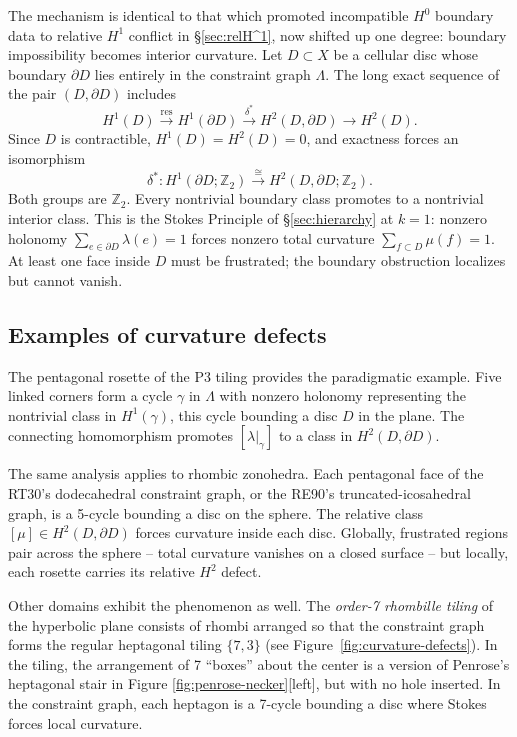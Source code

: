 \documentclass[11pt]{amsart}  %
\theoremstyle{plain}
\theoremstyle{definition}
\theoremstyle{remark}
\newcommand{\style}[1]{{\em #1}} %
\newcommand{\Z}{\mathbb{Z}} %
\newcommand{\cgraph}{\Lambda} %
\newcommand{\coupling}{\lambda} %
\begin{document}
The mechanism is identical to that which promoted incompatible $H^0$ boundary data to relative $H^1$ conflict in \S\ref{sec:relH^1}, now shifted up one degree: boundary impossibility becomes interior curvature.
Let $D \subset X$ be a cellular disc whose boundary $\partial D$ lies entirely in the constraint graph $\cgraph$. The long exact sequence of the pair $(D, \partial D)$ includes
\[
H^1(D) \xrightarrow{\mathrm{res}} H^1(\partial D) \xrightarrow{\delta^*} H^2(D, \partial D) \to H^2(D).
\]
Since $D$ is contractible, $H^1(D) = H^2(D) = 0$, and exactness forces an isomorphism
\[
\delta^*: H^1(\partial D; \Z_2) \xrightarrow{\;\cong\;} H^2(D, \partial D; \Z_2).
\]
Both groups are $\Z_2$. Every nontrivial boundary class promotes to a nontrivial interior class. This is the Stokes Principle of \S\ref{sec:hierarchy} at $k = 1$: nonzero holonomy $\sum_{e \in \partial D} \coupling(e) = 1$ forces nonzero total curvature $\sum_{f \subset D} \mu(f) = 1$. At least one face inside $D$ must be frustrated; the boundary obstruction localizes but cannot vanish.

\subsection{Examples of curvature defects}
\label{sec:curvature-defects}


The pentagonal rosette of the P3 tiling provides the paradigmatic example. Five linked corners form a cycle $\gamma$ in $\cgraph$ with nonzero holonomy representing the nontrivial class in $H^1(\gamma)$, this cycle bounding a disc $D$ in the plane. The connecting homomorphism promotes $[\coupling|_\gamma]$ to a class in $H^2(D, \partial D)$. 

The same analysis applies to rhombic zonohedra. Each pentagonal face of the RT30's dodecahedral constraint graph, or the RE90's truncated-icosahedral graph, is a 5-cycle bounding a disc on the sphere. The relative class $[\mu] \in H^2(D, \partial D)$ forces curvature inside each disc. Globally, frustrated regions pair across the sphere -- total curvature vanishes on a closed surface -- but locally, each rosette carries its relative $H^2$ defect.

Other domains exhibit the phenomenon as well. The \style{order-7 rhombille tiling} of the hyperbolic plane consists of rhombi arranged so that the constraint graph forms the regular heptagonal tiling $\{7,3\}$ (see Figure~\ref{fig:curvature-defects}). In the tiling, the arrangement of 7 ``boxes'' about the center is a version of Penrose's heptagonal stair in Figure \ref{fig:penrose-necker}[left], but with no hole inserted. In the constraint graph, each heptagon is a 7-cycle bounding a disc where Stokes forces local curvature. 
\end{document}
